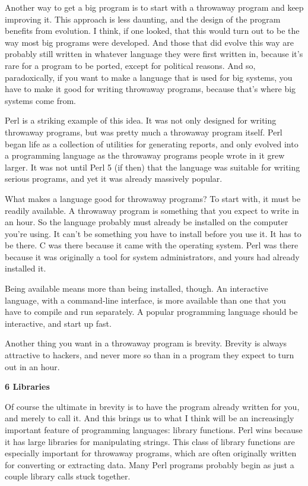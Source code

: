 Another way to get a big program is to start with a throwaway program
and keep improving it. This approach is less daunting, and the design of
the program benefits from evolution. I think, if one looked, that this
would turn out to be the way most big programs were developed. And those
that did evolve this way are probably still written in whatever language
they were first written in, because it's rare for a program to be
ported, except for political reasons. And so, paradoxically, if you want
to make a language that is used for big systems, you have to make it
good for writing throwaway programs, because that's where big systems
come from.

Perl is a striking example of this idea. It was not only designed for
writing throwaway programs, but was pretty much a throwaway program
itself. Perl began life as a collection of utilities for generating
reports, and only evolved into a programming language as the throwaway
programs people wrote in it grew larger. It was not until Perl 5 (if
then) that the language was suitable for writing serious programs, and
yet it was already massively popular.

What makes a language good for throwaway programs? To start with, it
must be readily available. A throwaway program is something that you
expect to write in an hour. So the language probably must already be
installed on the computer you're using. It can't be something you have
to install before you use it. It has to be there. C was there because it
came with the operating system. Perl was there because it was originally
a tool for system administrators, and yours had already installed it.

Being available means more than being installed, though. An interactive
language, with a command-line interface, is more available than one that
you have to compile and run separately. A popular programming language
should be interactive, and start up fast.

Another thing you want in a throwaway program is brevity. Brevity is
always attractive to hackers, and never more so than in a program they
expect to turn out in an hour.

\textbf{6 Libraries}

Of course the ultimate in brevity is to have the program already written
for you, and merely to call it. And this brings us to what I think will
be an increasingly important feature of programming languages: library
functions. Perl wins because it has large libraries for manipulating
strings. This class of library functions are especially important for
throwaway programs, which are often originally written for converting or
extracting data. Many Perl programs probably begin as just a couple
library calls stuck together.


